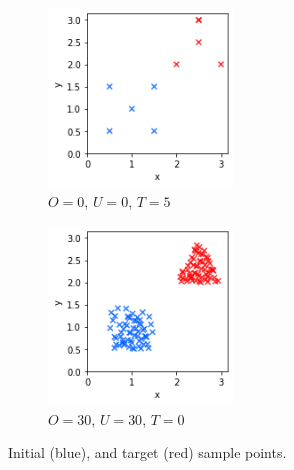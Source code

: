 \begin{figure}
  \centering
  \begin{subfigure}{\textwidth}
    \centering
    \begin{subfigure}{0.4\textwidth}
      \centering
      \includegraphics[width=0.7\textwidth]{figures/points-velocity-only/T5/start_target.png}
      \caption{$O=0$, $U=0$, $T=5$} 
    \end{subfigure}
    \begin{subfigure}{0.4\textwidth}
      \centering
      \includegraphics[width=0.7\textwidth]{figures/points-velocity-only/O30_U30_T0/start_target.png}
      \caption{$O=30$, $U=30$, $T=0$}
    \end{subfigure}
    \caption{Initial (blue), and target (red) sample points.}
  \end{subfigure}\\
  \begin{subfigure}{\textwidth}

\end{subfigure}
\end{figure}
